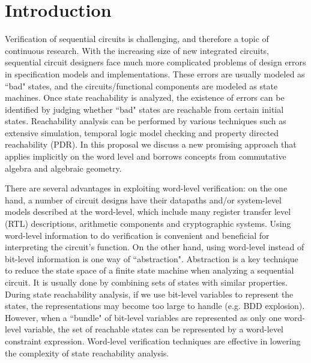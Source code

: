 \section{Introduction}
Verification of sequential circuits is challenging, and therefore a topic of continuous research. With
the increasing size of new 
integrated circuits, sequential circuit designers face much more complicated problems of design errors in
specification models and implementations. These errors are usually modeled as ``bad" states,
and the circuits/functional components are modeled as state machines. Once state reachability is analyzed,
the existence of errors can be identified by judging whether ``bad" states are reachable from certain initial states.
Reachability analysis can be performed by various techniques such as extensive simulation, temporal logic model checking
and property directed reachability (PDR). In this proposal we discuss a new promising approach that applies implicitly on the
word level and borrows concepts from commutative algebra and algebraic geometry.

There are several advantages in exploiting word-level verification: on the one hand, a number of circuit designs have 
their datapaths and/or system-level models described  at the word-level, which include many register transfer level 
(RTL) descriptions,
arithmetic components and cryptographic systems. Using word-level information to do verification is convenient 
and beneficial for interpreting the circuit's function. On the other hand, using word-level instead of bit-level
information is one way of ``abstraction". Abstraction is a key technique to reduce the state space of a finite state machine 
when analyzing a sequential circuit. It is usually done by combining sets of states with similar properties.
During state reachability analysis, if we use bit-level variables to  represent the states, 
the representations may become too large to handle (e.g. BDD explosion). However, when a ``bundle" of bit-level variables are represented as only one
word-level variable, the set of reachable states can be represented by a  word-level constraint 
expression. Word-level 
verification techniques are effective in lowering the complexity of state reachability analysis.

